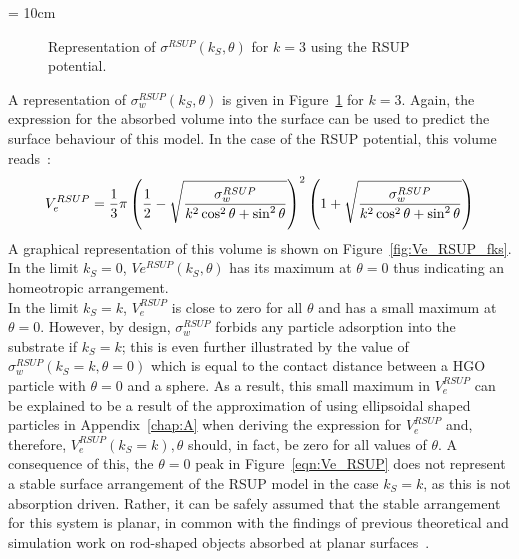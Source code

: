 

\picW = 10cm
\begin{figure}
	\centering
	\caption{Representation of $\sigma^{RSUP}(k_S,\theta)$ for $k=3$ using the RSUP
	potential.}
	\label{fig:sigma_RSUP}
\end{figure}



A representation of $\sigma^{RSUP}_w(k_S,\theta)$ is given in Figure~\ref{fig:sigma_RSUP} for
$k=3$. Again, the expression for the absorbed volume into the surface can be used to predict the
surface behaviour of this model. In the case of the RSUP potential, this volume reads~:
%
\begin{equation}
	V_e^{RSUP}=\frac{1}{3}\pi\left( \frac{1}{2}-
	\sqrt{\frac{\sigma^{RSUP}_w}{k^2\cos^2\theta+\sin^2\theta}}\right)^2 
	\left( 1 + \sqrt{\frac{\sigma^{RSUP}_w}{k^2\cos^2\theta+\sin^2\theta}} \right)
	\label{eqn:Ve_RSUP}
\end{equation}
%
A graphical representation of this volume is shown on Figure~\ref{fig:Ve_RSUP_fks}. 
In the limit $k_S = 0$, $Ve^{RSUP}(k_S,\theta)$ has its maximum at $\theta = 0$ thus indicating 
an homeotropic arrangement.\\
%
In the limit $k_S = k$, $V_e^{RSUP}$ is close to zero for all $\theta$ and has a small maximum at 
$\theta = 0$. However, by design, $\sigma_w^{RSUP}$ forbids any particle adsorption into the
substrate if $k_S=k$; this is even further illustrated by the value of
$\sigma_w^{RSUP}(k_S=k,\theta=0)$ which is equal to the contact distance between a HGO particle
with $\theta=0$ and a sphere. As a result, this small maximum in $V_e^{RSUP}$ can be explained
to be a result of the approximation of using ellipsoidal shaped particles 
in Appendix~\ref{chap:A} when deriving
the expression for $V_e^{RSUP}$ and, therefore, $V_e^{RSUP}(k_S=k),\theta$ should, in fact,
be zero for all
values of $\theta$. A consequence of this, the $\theta=0$ peak in Figure~\ref{eqn:Ve_RSUP} 
does not represent a 
stable surface arrangement of the RSUP model in the case $k_S=k$, as this is not 
absorption driven. Rather, it can be safely assumed that the stable arrangement for this system 
is planar, in common with the findings of previous 
theoretical and simulation work on rod-shaped objects absorbed at planar 
surfaces~\cite{HolystPoniewierski88,Chrzanowska_Teixera_01,VanRoijDijkstra00,DijkstraVanRoij01}.


